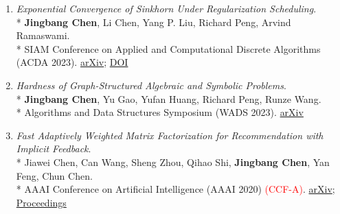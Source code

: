 \documentclass[10pt]{article}
\newcommand{\ccf}[1]{\textcolor{red}{(CCF-#1)}}
\newcommand{\pub}[4]{%
  \item \begin{minipage}[t]{\linewidth}\raggedright
  \textit{#1}.\\*
  #2\\*
  #3 #4
  \end{minipage}
}
\begin{document}
\begin{enumerate}[leftmargin=1.7em,itemsep=4pt,topsep=3pt]
  \pub{Exponential Convergence of Sinkhorn Under Regularization Scheduling}
  {\textbf{Jingbang Chen}, Li Chen, Yang P. Liu, Richard Peng, Arvind Ramaswami.}
  {SIAM Conference on Applied and Computational Discrete Algorithms (ACDA 2023).}
  { \href{https://arxiv.org/abs/2207.00736}{arXiv}; \href{https://doi.org/10.1137/1.9781611977714.16}{DOI}}

  \pub{Hardness of Graph-Structured Algebraic and Symbolic Problems}
  {\textbf{Jingbang Chen}, Yu Gao, Yufan Huang, Richard Peng, Runze Wang.}
  {Algorithms and Data Structures Symposium (WADS 2023).}
  { \href{https://arxiv.org/abs/2109.12736}{arXiv}}

  \pub{Fast Adaptively Weighted Matrix Factorization for Recommendation with Implicit Feedback}
  {Jiawei Chen, Can Wang, Sheng Zhou, Qihao Shi, \textbf{Jingbang Chen}, Yan Feng, Chun Chen.}
  {AAAI Conference on Artificial Intelligence (AAAI 2020) \ccf{A}.}
  { \href{https://arxiv.org/abs/2003.01892}{arXiv}; \href{https://ojs.aaai.org/index.php/AAAI/article/view/5751}{Proceedings}}
\end{enumerate}
\end{document}
